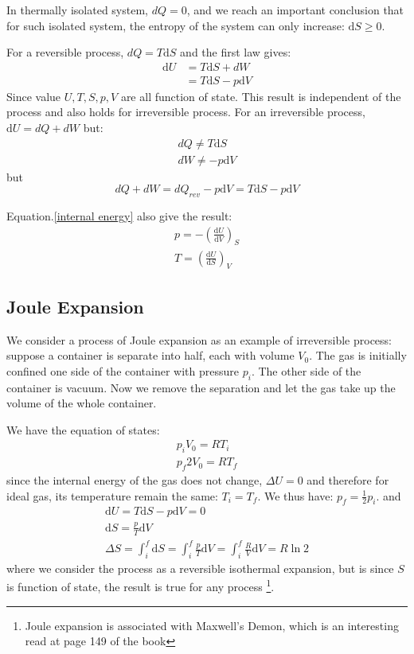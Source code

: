 \documentclass{article}
\newcommand{\dbar}{d}
\newcommand{\dnor}{\text{d}}
\begin{document}
In thermally isolated system, $\dbar Q = 0$, and we reach an
important conclusion that for such isolated system, the entropy
of the system can only increase: $ \dnor S \ge 0$.

For a reversible process, $\dbar Q = T \dnor S$ and the first law gives:
\begin{align}
    \dnor U & = T \dnor S + \dbar W \\
            & = T \dnor S - p \dnor V \label{internal energy}
\end{align}
Since value $U, T, S, p, V$ are all function of state. This 
result is independent of the process and also holds for 
irreversible process.
For an irreversible process, $\dnor U = \dbar Q + \dbar W$
but:
\begin{gather}
    \dbar Q \neq  T \dnor S \\
    \dbar W \neq  - p \dnor V 
\end{gather}
but 
\begin{equation}
    \dbar Q + \dbar W = \dbar Q_{rev} - p \dnor V = T \dnor S - p \dnor V
\end{equation}

Equation.\ref{internal energy} also give the result:
\begin{gather}
    p = - \left(\frac{\dnor U}{\dnor V}\right)_S \\
    T = \left(\frac{\dnor U}{\dnor S}\right)_V
\end{gather}

\subsection*{Joule Expansion}
We consider a process of Joule expansion as an example of irreversible process:
suppose a container is separate into half, each with volume $V_0$. The gas is 
initially confined one side of the container with pressure $p_i$. The other side
of the container is vacuum. Now we remove the separation and let the 
gas take up the volume of the whole container.

We have the equation of states:
\begin{gather}
    p_i V_0 = RT_i \\
    p_f 2V_0 = RT_f
\end{gather}
since the internal energy of the gas does not change, $\Delta U = 0$ and therefore 
for ideal gas, its temperature remain the same: $T_i = T_f$. We thus have:
$p_f = \frac{1}{2} p_i$. and
\begin{gather}
    \dnor U = T \dnor S - p \dnor V = 0 \\
    \dnor S = \frac{p}{T} \dnor V \\ 
    \Delta S = \int_i^f \dnor S = \int_i^f \frac{p}{T} \dnor V = \int_i^f \frac{R}{V} \dnor V = R \ln2
\end{gather}
where we consider the process as a reversible isothermal expansion, but is since $S$ is function
of state, the result is true for any process
\footnote{
Joule expansion is associated with Maxwell's Demon, which is an interesting read at page 149 of the book
}.
\end{document}
